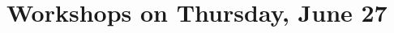 \chapter{Workshops on Thursday, June 27}
\begin{spacing}{1.0}


\newcommand{\descriptionWorkshop}[5]{
\begingroup{}
\vspace{8mm}
  \section*{{\huge \textbf{#1}} #3}  

\ifthenelse{\equal{\targetoutput}{print}}{
  \ifthenelse{\equal{#4}{}}{
  
  }{
      workshop homepage\footnote{\url{#4}} 
  }
  \hfill {\bf {\large #2} }
}{
  \href{#4}{workshop homepage}
  \hfill {\bf #2 }
}
\\*
{#5}
\endgroup{}
}


\newcommand{\descriptionLabTour}[5]{
\begingroup{}
\vspace{8mm}
  \section*{{\huge \textbf{#1}} #3}  

\ifthenelse{\equal{\targetoutput}{print}}{
  \ifthenelse{\equal{#4}{}}{
  
  }{
      Lab homepage\footnote{\url{#4}} 
  }
  \hfill {\bf {\large #2} }
}{
  \href{#4}{Lab homepage}
  \hfill {\bf #2 }
}
\\*
{#5}
\endgroup{}
}



\vspace*{-2.0cm}


\end{spacing}
